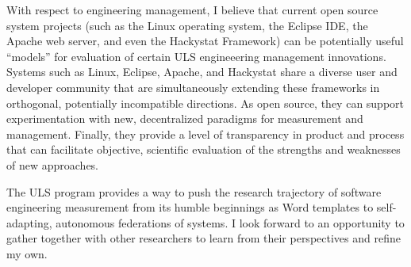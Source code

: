 \documentclass[10pt,twocolumn]{article}
\begin{document}
With respect to engineering management, I believe that current open source
system projects (such as the Linux operating system, the Eclipse IDE, the
Apache web server, and even the Hackystat Framework) can be potentially
useful ``models'' for evaluation of certain ULS engineeering management
innovations.  Systems such as Linux, Eclipse, Apache, and Hackystat share a
diverse user and developer community that are simultaneously extending
these frameworks in orthogonal, potentially incompatible directions.  As
open source, they can support experimentation with new, decentralized
paradigms for measurement and management.   Finally, they provide a level
of transparency in product and process that can facilitate objective, scientific
evaluation of the strengths and weaknesses of new approaches. 

The ULS program provides a way to push the research trajectory of software
engineering measurement from its humble beginnings as Word templates to
self-adapting, autonomous federations of systems.  I look forward to an opportunity
to gather together with other researchers to learn from their perspectives and 
refine my own. 
 


\end{document}
